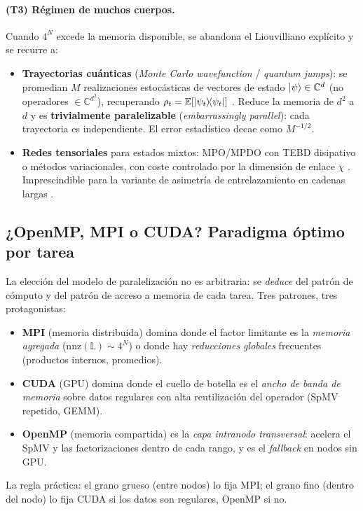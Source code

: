 \documentclass[11pt,a4paper]{article}
\theoremstyle{definition}
\theoremstyle{plain}
\begin{document}
\paragraph{(T3) Régimen de muchos cuerpos.}
Cuando $4^N$ excede la memoria disponible, se abandona el Liouvilliano explícito y se recurre a:
\begin{itemize}[leftmargin=1.6em,itemsep=2pt]
\item \textbf{Trayectorias cuánticas} (\emph{Monte Carlo wavefunction} / \emph{quantum jumps}): se promedian
$M$ realizaciones estocásticas de vectores de estado $\ket{\psi}\in\mathbb{C}^{d}$ (no operadores
$\in\mathbb{C}^{d^2}$), recuperando $\rho_t=\mathbb{E}[\dyad{\psi_t}{\psi_t}]$ \cite{Daley2014}. Reduce la
memoria de $d^2$ a $d$ y es \textbf{trivialmente paralelizable} (\emph{embarrassingly parallel}): cada
trayectoria es independiente. El error estadístico decae como $M^{-1/2}$.
\item \textbf{Redes tensoriales} para estados mixtos: MPO/MPDO con TEBD disipativo o métodos variacionales,
con coste controlado por la dimensión de enlace $\chi$ \cite{Orus2014,Weimer2021}. Imprescindible para
la variante de asimetría de entrelazamiento en cadenas largas \cite{AresCalabreseMurciano2025}.
\end{itemize}

\subsection{¿OpenMP, MPI o CUDA? Paradigma óptimo por tarea}
\label{sec:paradigma_por_tarea}

La elección del modelo de paralelización no es arbitraria: se \emph{deduce} del
patrón de cómputo y del patrón de acceso a memoria de cada tarea. Tres patrones,
tres protagonistas:
\begin{itemize}[leftmargin=1.6em,itemsep=1pt]
\item \textbf{MPI} (memoria distribuida) domina donde el factor limitante es la
\emph{memoria agregada} ($\mathrm{nnz}(\mathbb{L})\sim4^N$) o donde hay
\emph{reducciones globales} frecuentes (productos internos, promedios).
\item \textbf{CUDA} (GPU) domina donde el cuello de botella es el \emph{ancho de
banda de memoria} sobre datos regulares con alta reutilización del operador
(SpMV repetido, GEMM).
\item \textbf{OpenMP} (memoria compartida) es la \emph{capa intranodo
transversal}: acelera el SpMV y las factorizaciones dentro de cada rango, y es el
\emph{fallback} en nodos sin GPU.
\end{itemize}
La regla práctica: el grano grueso (entre nodos) lo fija MPI; el grano fino
(dentro del nodo) lo fija CUDA si los datos son regulares, OpenMP si no.
\end{document}
